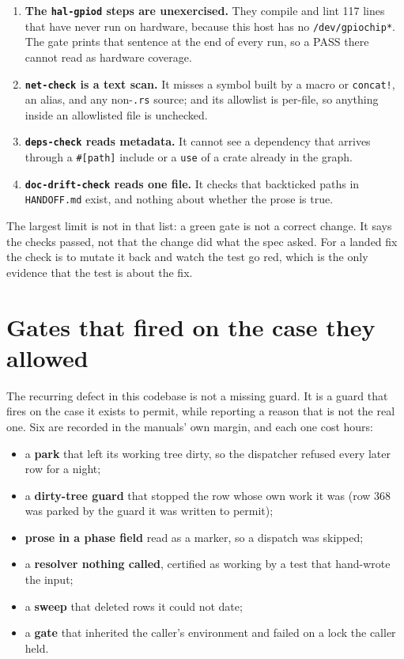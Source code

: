 \begin{enumerate}
	\item \textbf{The \texttt{hal-gpiod} steps are unexercised.} They compile and lint 117
	lines that have never run on hardware, because this host has no \texttt{/dev/gpiochip*}.
	The gate prints that sentence at the end of every run, so a PASS there cannot read as
	hardware coverage.
	\item \textbf{\texttt{net-check} is a text scan.} It misses a symbol built by a macro or
	\texttt{concat!}, an alias, and any non-\texttt{.rs} source; and its allowlist is per-file,
	so anything inside an allowlisted file is unchecked.
	\item \textbf{\texttt{deps-check} reads metadata.} It cannot see a dependency that arrives
	through a \texttt{\#[path]} include or a \texttt{use} of a crate already in the graph.
	\item \textbf{\texttt{doc-drift-check} reads one file.} It checks that backticked paths in
	\texttt{HANDOFF.md} exist, and nothing about whether the prose is true.
\end{enumerate}

The largest limit is not in that list: a green gate is not a correct change. It says the
checks passed, not that the change did what the spec asked. For a landed fix the check is to
mutate it back and watch the test go red, which is the only evidence that the test is about
the fix.

\section{Gates that fired on the case they allowed}

The recurring defect in this codebase is not a missing guard. It is a guard that fires on the
case it exists to permit, while reporting a reason that is not the real one. Six are recorded
in the manuals' own margin, and each one cost hours:

\begin{itemize}
	\item a \textbf{park} that left its working tree dirty, so the dispatcher refused every
	later row for a night;
	\item a \textbf{dirty-tree guard} that stopped the row whose own work it was (row 368 was
	parked by the guard it was written to permit);
	\item \textbf{prose in a phase field} read as a marker, so a dispatch was skipped;
	\item a \textbf{resolver nothing called}, certified as working by a test that hand-wrote
	the input;
	\item a \textbf{sweep} that deleted rows it could not date;
	\item a \textbf{gate} that inherited the caller's environment and failed on a lock the
	caller held.
\end{itemize}

